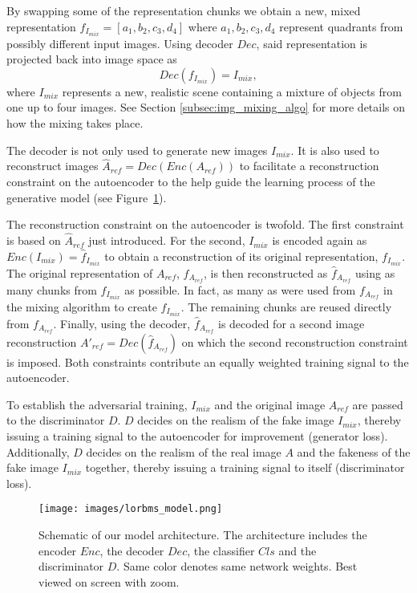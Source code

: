 \documentclass[a4paper,12pt]{report}
\begin{document}
By swapping some of the representation chunks we obtain a new, mixed representation $f_{I_{mix}} = [a_1, b_2, c_3, d_4]$ where $a_1,b_2,c_3,d_4$ represent quadrants from possibly different input images. Using decoder $Dec$, said representation is projected back into image space as
\begin{equation} \label{eq:3}
    Dec(f_{I_{mix}}) = I_{mix},
\end{equation}
where $I_{mix}$ represents a new, realistic scene containing a mixture of objects from one up to four images. See Section \ref{subsec:img_mixing_algo} for more details on how the mixing takes place.

The decoder is not only used to generate new images $I_{mix}$. It is also used to reconstruct images $\hat{A}_{ref} = Dec(Enc(A_{ref}))$ to facilitate a reconstruction constraint on the autoencoder to the help guide the learning process of the generative model (see Figure~\ref{fig:model_arch}).

The reconstruction constraint on the autoencoder is twofold. The first constraint is based on $\hat{A}_{ref}$ just introduced. For the second, $I_{mix}$ is encoded again as $Enc(I_{mix}) = \hat{f}_{I_{mix}}$ to obtain a reconstruction of its original representation, $f_{I_{mix}}$. The original representation of $A_{ref}$, $f_{A_{ref}}$, is then reconstructed as $\hat{f}_{A_{ref}}$ using as many chunks from $\hat{f}_{I_{mix}}$ as possible. In fact, as many as were used from $f_{A_{ref}}$ in the mixing algorithm to create $f_{I_{mix}}$. The remaining chunks are reused directly from $f_{A_{ref}}$. Finally, using the decoder, $\hat{f}_{A_{ref}}$ is decoded for a second image reconstruction $A'_{ref} = Dec(\hat{f}_{A_{ref}})$ on which the second reconstruction constraint is imposed. Both constraints contribute an equally weighted training signal to the autoencoder.

To establish the adversarial training, $I_{mix}$ and the original image $A_{ref}$ are passed to the discriminator $D$. $D$ decides on the realism of the fake image $I_{mix}$, thereby issuing a training signal to the autoencoder for improvement (generator loss). Additionally, $D$ decides on the realism of the real image $A$ and the fakeness of the fake image $I_{mix}$ together, thereby issuing a training signal to itself (discriminator loss).

\begin{figure}[ht]
\centering
\texttt{[image: images/lorbms\_model.png]}
\caption[Schematic of our model architecture.]{Schematic of our model architecture. The architecture includes the encoder $Enc$, the decoder $Dec$, the classifier $Cls$ and the discriminator $D$. Same color denotes same network weights. Best viewed on screen with zoom.}
\label{fig:model_arch}
\end{figure}
\end{document}
